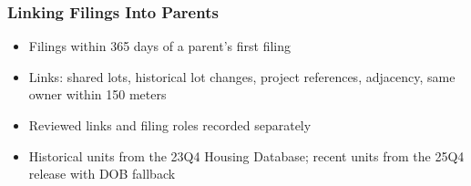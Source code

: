 \begin{frame}
    \frametitle{Linking Filings Into Parents}
    \begin{itemize}[itemsep=0.5em]
        \item Filings within 365 days of a parent's first filing
        \item Links: shared lots, historical lot changes, project references, adjacency, same owner within 150 meters
        \item Reviewed links and filing roles recorded separately
        \item Historical units from the 23Q4 Housing Database; recent units from the 25Q4 release with DOB fallback
    \end{itemize}
\end{frame}
